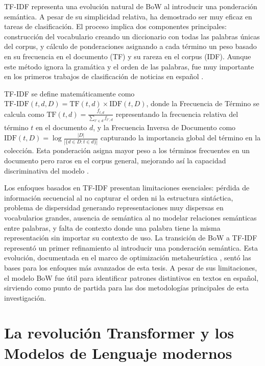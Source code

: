 TF-IDF representa una evolución natural de BoW al introducir una ponderación semántica. A pesar de su simplicidad relativa, ha demostrado ser muy eficaz en tareas de clasificación. El proceso implica dos componentes principales: construcción del vocabulario creando un diccionario con todas las palabras únicas del corpus, y cálculo de ponderaciones asignando a cada término un peso basado en su frecuencia en el documento (TF) y su rareza en el corpus (IDF). Aunque este método ignora la gramática y el orden de las palabras, fue muy importante en los primeros trabajos de clasificación de noticias en español \cite{acosta2019construccion}.

TF-IDF se define matemáticamente como $\text{TF-IDF}(t,d,D) = \text{TF}(t,d) \times \text{IDF}(t,D)$, donde la Frecuencia de Término se calcula como $\text{TF}(t,d) = \frac{f_{t,d}}{\sum_{t' \in d} f_{t',d}}$ representando la frecuencia relativa del término $t$ en el documento $d$, y la Frecuencia Inversa de Documento como $\text{IDF}(t,D) = \log\frac{|D|}{|\{d \in D : t \in d\}|}$ capturando la importancia global del término en la colección. Esta ponderación asigna mayor peso a los términos frecuentes en un documento pero raros en el corpus general, mejorando así la capacidad discriminativa del modelo \cite{thota2018fake}.

Los enfoques basados en TF-IDF presentan limitaciones esenciales: pérdida de información secuencial al no capturar el orden ni la estructura sintáctica, problema de dispersidad generando representaciones muy dispersas en vocabularios grandes, ausencia de semántica al no modelar relaciones semánticas entre palabras, y falta de contexto donde una palabra tiene la misma representación sin importar su contexto de uso. La transición de BoW a TF-IDF representó un primer refinamiento al introducir una ponderación semántica. Esta evolución, documentada en el marco de optimización metaheurística \cite{hurtado2024calibracion}, sentó las bases para los enfoques más avanzados de esta tesis. A pesar de sus limitaciones, el modelo BoW fue útil para identificar patrones distintivos en textos en español, sirviendo como punto de partida para las dos metodologías principales de esta investigación.

\section{La revolución Transformer y los Modelos de Lenguaje modernos}
\label{sec:transformers_modelos_lenguaje}

